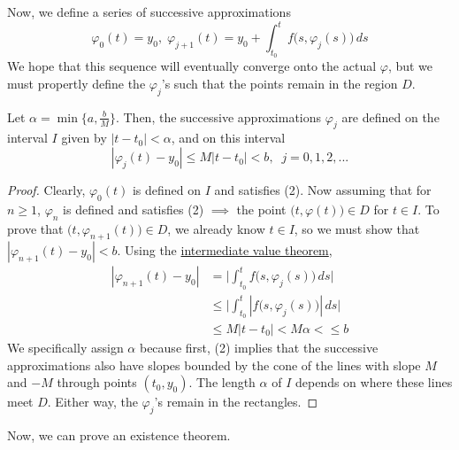 \documentclass{article}
\newcounter{theorem}[section]
\begin{document}
    Now, we define a series of successive approximations
    \begin{equation}
      \varphi_0 (t) = y_0, \; \varphi_{j+1} (t) = y_0 + \int_{t_0}^t f\big(s, \varphi_j (s) \big) \, ds
    \end{equation}
    We hope that this sequence will eventually converge onto the actual $\varphi$, but we must propertly define the $\varphi_j$'s such that the points remain in the region $D$. 

    \begin{lemma}
      \label{thm:domain-of-the-successive-approximations}
    Let $\alpha = \min\{a, \frac{b}{M}\}$. Then, the successive approximations $\varphi_j$ are defined on the interval $I$ given by $|t - t_0| < \alpha$, and on this interval 
    \begin{equation}
        |\varphi_j (t) - y_0| \leq M |t - t_0| < b, \;\; j = 0, 1, 2, ...
    \end{equation}
    \end{lemma}
    \begin{proof}
    Clearly, $\varphi_0 (t)$ is defined on $I$ and satisfies (2). Now assuming that for $n \geq 1$, $\varphi_n$ is defined and satisfies (2) $\implies$ the point $\big( t, \varphi(t)\big) \in D$ for $t \in I$. To prove that $\big(t, \varphi_{n+1}(t)\big) \in D$, we already know $t \in I$, so we must show that $|\varphi_{n+1} (t) - y_0| < b$. Using the \hyperref[real-thm:intermediate-value-theorem]{intermediate value theorem},
    \begin{align*}
        |\varphi_{n+1}(t) - y_0| & = \bigg| \int_{t_0}^t f\big(s, \varphi_j(s)\big) \, ds \bigg| \\
        & \leq \bigg| \int_{t_0}^t |f\big(s, \varphi_j (s)\big)|\, ds\bigg| \\
        & \leq M |t - t_0| < M\alpha < \leq b
    \end{align*}
    We specifically assign $\alpha$ because first, (2) implies that the successive approximations also have slopes bounded by the cone of the lines with slope $M$ and $-M$ through points $(t_0, y_0)$. The length $\alpha$ of $I$ depends on where these lines meet $D$. Either way, the $\varphi_j$'s remain in the rectangles.
    \end{proof}

    Now, we can prove an existence theorem. 
\end{document}
